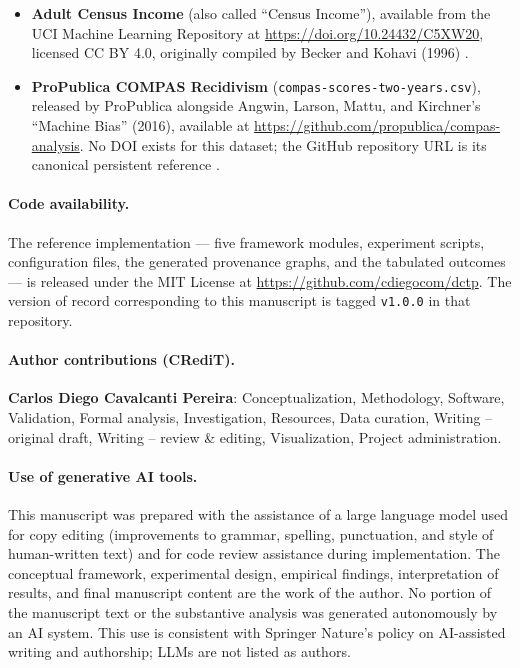 \documentclass[11pt]{article}
\begin{document}
\begin{itemize}[leftmargin=*, itemsep=2pt]
\item \textbf{Adult Census Income} (also called ``Census Income''), available from the UCI Machine Learning Repository at \url{https://doi.org/10.24432/C5XW20}, licensed CC BY 4.0, originally compiled by Becker and Kohavi (1996) \cite{Becker1996Adult}.
\item \textbf{ProPublica COMPAS Recidivism} (\texttt{compas-scores-two-years.csv}), released by ProPublica alongside Angwin, Larson, Mattu, and Kirchner's ``Machine Bias'' (2016), available at \url{https://github.com/propublica/compas-analysis}. No DOI exists for this dataset; the GitHub repository URL is its canonical persistent reference \cite{ProPublica2016COMPAS}.
\end{itemize}

\paragraph{Code availability.} The reference implementation --- five framework modules, experiment scripts, configuration files, the generated provenance graphs, and the tabulated outcomes --- is released under the MIT License at \url{https://github.com/cdiegocom/dctp}. The version of record corresponding to this manuscript is tagged \texttt{v1.0.0} in that repository.

\paragraph{Author contributions (CRediT).} \textbf{Carlos Diego Cavalcanti Pereira}: Conceptualization, Methodology, Software, Validation, Formal analysis, Investigation, Resources, Data curation, Writing -- original draft, Writing -- review \& editing, Visualization, Project administration.

\paragraph{Use of generative AI tools.} This manuscript was prepared with the assistance of a large language model used for copy editing (improvements to grammar, spelling, punctuation, and style of human-written text) and for code review assistance during implementation. The conceptual framework, experimental design, empirical findings, interpretation of results, and final manuscript content are the work of the author. No portion of the manuscript text or the substantive analysis was generated autonomously by an AI system. This use is consistent with Springer Nature's policy on AI-assisted writing and authorship; LLMs are not listed as authors.

\begingroup
\sloppy
\printbibliography
\endgroup
\end{document}
